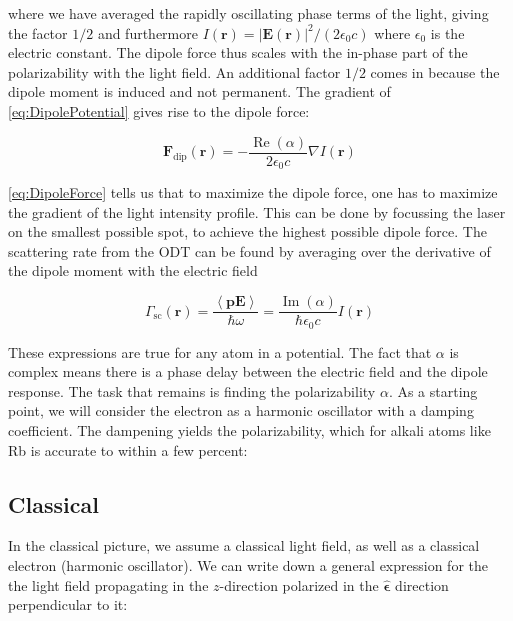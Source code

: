 where we have averaged the rapidly oscillating phase terms of the light, giving the factor $1/2$ and furthermore $I(\mathbf{r}) = |\mathbf{E}(\mathbf{r})|^2/(2\epsilon_0 c)$ where $\epsilon_0$ is the electric constant. The dipole force thus scales with the in-phase part of the polarizability with the light field. An additional factor $1/2$ comes in because the dipole moment is induced and not permanent. The gradient of \cref{eq:DipolePotential} gives rise to the dipole force:

\begin{equation}\label{eq:DipoleForce}
	\mathbf{F}_{\text{dip}}(\mathbf{r}) = - \frac{\operatorname{Re}(\alpha)}{2\epsilon_0c}\nabla I(\mathbf{r})
\end{equation}

\cref{eq:DipoleForce} tells us that to maximize the dipole force, one has to maximize the gradient of the light intensity profile. This can be done by focussing the laser on the smallest possible spot, to achieve the highest possible dipole force. The scattering rate from the ODT can be found by averaging over the derivative of the dipole moment with the electric field 

\begin{equation}\label{eq:ScatteringRate}
	\Gamma_{\text{sc}}(\mathbf{r}) = \frac{\left\langle \mathbf{p} \mathbf{E} \right\rangle}{\hbar \omega}
	 = \frac{\operatorname{Im}(\alpha)}{\hbar \epsilon_0 c} I(\mathbf{r}) 
\end{equation}

These expressions are true for any atom in a potential. The fact that $\alpha$ is complex means there is a phase delay between the electric field and the dipole response. The task that remains is finding the polarizability $\alpha$. As a starting point, we will consider the electron as a harmonic oscillator with a damping coefficient. The dampening yields the polarizability, which for alkali atoms like Rb is accurate to within a few percent: 

\subsection{Classical}

In the classical picture, we assume a classical light field, as well as a classical electron (harmonic oscillator). We can write down a general expression for the the light field propagating in the $z$-direction polarized in the $\bm{\hat{\epsilon}}$ direction perpendicular to it:

